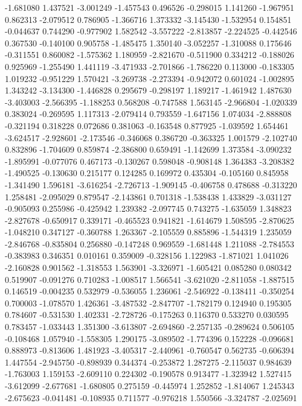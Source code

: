 -1.681080
1.437521
-3.001249
-1.457543
0.496526
-0.298015
1.141260
-1.967951
0.862313
-2.079512
0.786905
-1.366716
1.373332
-3.145430
-1.532954
0.154851
-0.044637
0.744290
-0.977902
1.582542
-3.557222
-2.813857
-2.224525
-0.442546
0.367530
-0.140100
0.905758
-1.485475
1.350140
-3.052257
-1.310088
0.175646
-0.311551
0.860082
-1.575362
1.180959
-2.821670
-0.511900
0.334212
-0.188026
0.925969
-1.255490
1.441119
-3.471933
-2.701866
-1.786220
0.113000
-0.183305
1.019232
-0.951229
1.570421
-3.269738
-2.273394
-0.942072
0.601024
-1.002895
1.343242
-3.134300
-1.446828
0.295679
-0.298197
1.189217
-1.461942
1.487630
-3.403003
-2.566395
-1.188253
0.568208
-0.747588
1.563145
-2.966804
-1.020339
0.383024
-0.269595
1.117313
-2.079414
0.793559
-1.647156
1.074034
-2.888808
-0.321194
0.318228
0.072686
0.381063
-0.163548
0.877925
-1.039592
1.654461
-3.624517
-2.928601
-2.173546
-0.346068
0.386720
-0.363325
1.001579
-2.102740
0.832896
-1.704609
0.859874
-2.386800
0.659491
-1.142699
1.373584
-3.090232
-1.895991
-0.077076
0.467173
-0.130267
0.598048
-0.908148
1.364383
-3.208382
-1.490525
-0.130630
0.215177
0.124285
0.169972
0.435304
-0.105160
0.845958
-1.341490
1.596181
-3.616254
-2.726713
-1.909145
-0.406758
0.478688
-0.313220
1.258481
-2.095029
0.879547
-2.143861
0.701318
-1.538438
1.433829
-3.031127
-0.905093
0.255986
-0.425942
1.239382
-2.097745
0.743275
-1.635059
1.348823
-2.827678
-0.650917
0.339171
-0.465523
0.941821
-1.614679
1.508595
-2.870625
-1.048210
0.347127
-0.360788
1.263367
-2.105559
0.885896
-1.544319
1.235059
-2.846768
-0.835804
0.256880
-0.147248
0.969559
-1.681448
1.211088
-2.784553
-0.383983
0.346351
0.010161
0.359009
-0.328156
1.122983
-1.871021
1.041026
-2.160828
0.901562
-1.318553
1.563901
-3.326971
-1.605421
0.085280
0.080342
0.519907
-0.091276
0.710283
-1.008517
1.566541
-3.621020
-2.811058
-1.887515
0.146519
-0.004235
0.532979
-0.536055
1.236061
-2.546922
-0.138411
-0.350254
0.700003
-1.078570
1.426361
-3.487532
-2.847707
-1.782179
0.124940
0.195305
0.784607
-0.531530
1.402331
-2.728726
-0.175263
0.116370
0.533270
0.030595
0.783457
-1.033443
1.351300
-3.613807
-2.694860
-2.257135
-0.289624
0.506105
-0.108468
1.057940
-1.558305
1.290175
-3.089502
-1.774396
0.152228
-0.096681
0.888973
-0.813606
1.481923
-3.405317
-2.440961
-0.760547
0.562735
-0.606394
1.447554
-2.945750
-0.898939
0.344374
-0.253872
1.287275
-2.115037
0.984639
-1.763003
1.159153
-2.609110
0.224302
-0.190578
0.913477
-1.323942
1.527415
-3.612099
-2.677681
-1.680805
0.275159
-0.445974
1.252852
-1.814067
1.245343
-2.675623
-0.041481
-0.108935
0.711577
-0.976218
1.550566
-3.324787
-2.025691
